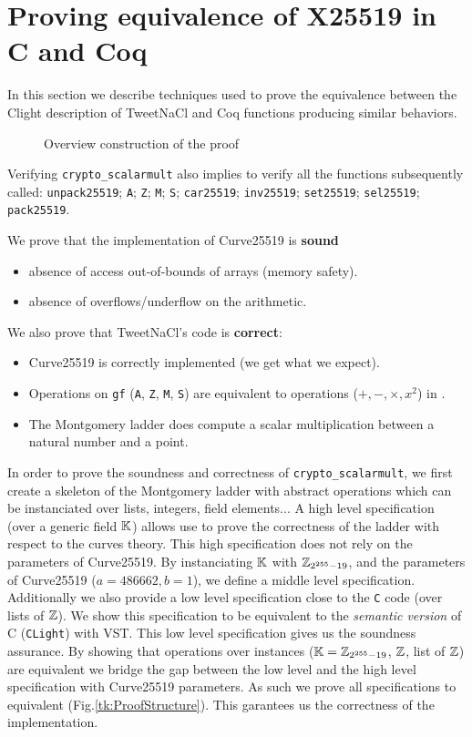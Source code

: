 \section{Proving equivalence of X25519 in C and Coq}
\label{C-Coq}

In this section we describe techniques used to prove the equivalence between the
Clight description of TweetNaCl and Coq functions producing similar behaviors.



\begin{figure}[h]
  
  \caption{Overview construction of the proof}
  \label{tk:ProofOverview}
\end{figure}


Verifying \texttt{crypto\_scalarmult} also implies to verify all the functions
subsequently called: \texttt{unpack25519}; \texttt{A}; \texttt{Z}; \texttt{M};
\texttt{S}; \texttt{car25519}; \texttt{inv25519}; \texttt{set25519}; \texttt{sel25519};
\texttt{pack25519}.

We prove that the implementation of Curve25519 is \textbf{sound} \ie
\begin{itemize}
\item absence of access out-of-bounds of arrays (memory safety).
\item absence of overflows/underflow on the arithmetic.
\end{itemize}
We also prove that TweetNaCl's code is \textbf{correct}:
\begin{itemize}
\item Curve25519 is correctly implemented (we get what we expect).
\item Operations on \texttt{gf} (\texttt{A}, \texttt{Z}, \texttt{M}, \texttt{S})
are equivalent to operations ($+,-,\times,x^2$) in \Zfield.
\item The Montgomery ladder does compute a scalar multiplication between a natural number and a point.
\end{itemize}

In order to prove the soundness and correctness of \texttt{crypto\_scalarmult},
we first create a skeleton of the Montgomery ladder with abstract operations which
can be instanciated over lists, integers, field elements...
A high level specification (over a generic field $\mathbb{K}$) allows use to prove the
correctness of the ladder with respect to the curves theory.
This high specification does not rely on the parameters of Curve25519.
By instanciating $\mathbb{K}$ with $\mathbb{Z}_{2^{255}-19}$, and the parameters of Curve25519 ($a = 486662, b = 1$),
we define a middle level specification.
Additionally we also provide a low level specification close to the \texttt{C} code
(over lists of $\mathbb{Z}$). We show this specification to be equivalent to the
\textit{semantic version} of C (\texttt{CLight}) with VST.
This low level specification gives us the soundness assurance.
By showing that operations over instances ($\mathbb{K} = \mathbb{Z}_{2^{255}-19}$, $\mathbb{Z}$, list of $\mathbb{Z}$) are
equivalent we bridge the gap between the low level and the high level specification
with Curve25519 parameters.
As such we prove all specifications to equivalent (Fig.\ref{tk:ProofStructure}).
This garantees us the correctness of the implementation.

